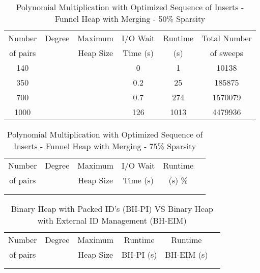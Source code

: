 \documentclass[11pt, one-sided]{amsart}
\begin{document}
\begin{table}[htbp]
   \centering
      \caption{Polynomial Multiplication with Optimized Sequence of Inserts - Funnel Heap with Merging - 50\% Sparsity}
   \begin{tabular}{|c|c|c|c|c|c|}
   	\hline
		 Number   & 	Degree	& Maximum 	& I/O Wait		&  Runtime 	& Total Number	\\ 
		 of pairs 	&			& Heap Size	& Time (s)		&	(s)	 	& of sweeps		\\ \hline
		 140		&			&			&	0		&	1		&	10138		\\
		 350		&			&			&	0.2		&	25		&	185875		\\
		 700		&			&			&	0.7		&	274		&	1570079		\\
		1000		&			&			&	126		&	1013		&	4479936		\\
	\hline
   \end{tabular}
   \label{tab:booktabs}
\end{table}


\begin{table}[htbp]
   \centering
      \caption{Polynomial Multiplication with Optimized Sequence of Inserts - Funnel Heap with Merging - 75\% Sparsity}
   \begin{tabular}{|c|c|c|c|c|c|}
   	\hline
		 Number   & 	Degree	& Maximum & I/O Wait		& Runtime 	 \\ 
		 of pairs 	&			& Heap Size	& Time (s)		&	(s)		 		\%				\\ \hline
		 		&			&			&			&						\\
		 		&			&			&			&						\\
   \end{tabular}
   \label{tab:booktabs}
\end{table}



\newpage
{}

\begin{table}[htbp]
   \centering
      \caption{Binary Heap with Packed ID's (BH-PI) VS Binary Heap with External ID Management (BH-EIM)}
   \begin{tabular}{|c|c|c|c|c|c|}
   	\hline
		 Number   & 	Degree	& Maximum 	& Runtime	& Runtime 		 \\ 
		 of pairs 	&			& Heap Size	& BH-PI (s)	& BH-EIM (s)		\\ \hline
		 		&			&			&			&				\\
		 		&			&			&			&				\\
   \end{tabular}
   \label{tab:booktabs}
\end{table}
\end{document}
